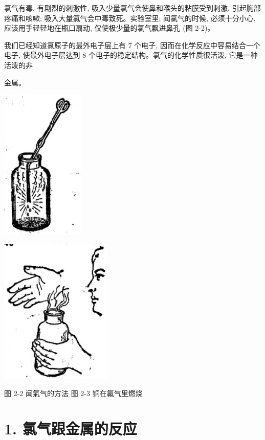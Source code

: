 \documentclass[10pt]{article}
\begin{document}
氯气有毒, 有剧烈的刺激性, 吸入少量氯气会使鼻和喉头的粘膜受到刺激, 引起胸部疼痛和咳嗽; 吸入大量氯气会中毒致死。实验室里; 闻氯气的时候, 必须十分小心, 应该用手轻轻地在瓶口扇动, 仅使极少量的氯气飘进鼻孔 (图 2-2)。

我们已经知道氯原子的最外电子层上有 7 个电子, 因而在化学反应中容易结合一个电子, 使最外电子层达到 8 个电子的稳定结构。氯气的化学性质很活泼, 它是一种活泼的非

金属。

\begin{center}
\includegraphics[max width=0.3\textwidth]{images/01912d0f-097c-7e75-8f32-4f326cd86c9f_33_947749.jpg}
\end{center}

\begin{center}
\includegraphics[max width=0.4\textwidth]{images/01912d0f-097c-7e75-8f32-4f326cd86c9f_33_337460.jpg}
\end{center}

图 2-2 闻氣气的方法 图 2-3 铜在氟气里燃烧

\section*{1. 氯气跟金属的反应}
\end{document}
